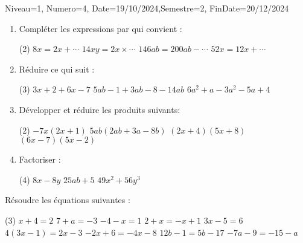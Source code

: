 \documentclass[a4paper,12pt]{article}
\begin{document}
\begin{Maquette}[DM]{Niveau=1, Numero=4, Date=19/10/2024,Semestre=2, FinDate=20/12/2024}

\begin{exercice}
\begin{enumerate}
\item Compléter les expressions par qui convient :
\begin{tasks}[style=itemize](2)
\task $8x = 2x + \cdots$
\task $14xy = 2x \times \cdots$
\task $146ab = 200ab - \cdots$
\task $52 x = 12 x + \cdots$

\end{tasks}
\item Réduire ce qui suit :
\begin{tasks}[style=itemize](3)
\task $3x+2+6x-7$
\task $5ab-1+3ab-8-14ab$
\task $6a^{2}+a-3a^{2}-5a+4$
\end{tasks}
\item Développer et réduire les produits suivants:
\begin{tasks}[style=itemize](2)
\task $-7x(2x+1)$
\task $5ab(2ab+3a-8b)$
\task $(2x+4)(5x+8)$
\task $(6x-7)(5x-2)$
\end{tasks}
\item Factoriser :
\begin{tasks}[style=itemize](4)
\task $8x-8y$
\task $25ab+5$
\task $49x^{2}+56y^{3}$
\end{tasks}
\end{enumerate}
\end{exercice}

\begin{exercice}
Résoudre les équations suivantes :
\begin{tasks}[style=itemize](3)
\task $x+4=2$
\task $7+a=-3$
\task $-4-x=1$
\task $2+x=-x+1$
\task $3x-5=6$
\task $4(3x-1)=2x-3$
\task $-2x+6=-4x-8$
\task $12b-1=5b-17$
\task $-7a-9=-15-a$
\end{tasks}
\end{exercice}

\begin{exercice}
\end{exercice}
\end{Maquette}
\end{document}
